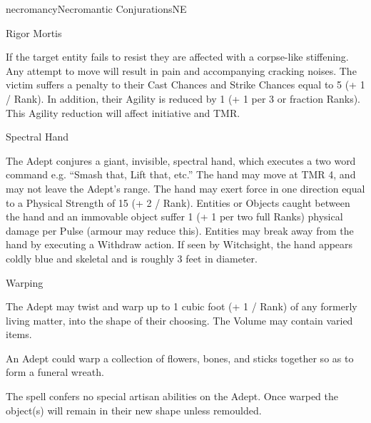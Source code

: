 \begin{College}[1.1]{necromancy}{Necromantic Conjurations}{NE}
\begin{spell}[G-9]{Rigor Mortis}
\begin{effects}
If the target entity fails to resist they are affected with a
corpse-like stiffening. Any attempt to move will result in pain and
accompanying cracking noises.  The victim suffers a penalty to their
Cast Chances and Strike Chances equal to 5 (+ 1 / Rank).  In addition,
their Agility is reduced by 1 (+ 1 per 3 or fraction Ranks).  This
Agility reduction will affect initiative and TMR.
\end{effects}
\end{spell}

\begin{spell}[G-10]{Spectral Hand}
\begin{effects}
The Adept conjures a giant, invisible, spectral hand, which executes a
two word command e.g.  “Smash that, Lift that, etc.”  The hand may
move at TMR 4, and may not leave the Adept’s range.  The hand may
exert force in one direction equal to a Physical Strength of 15 (+ 2 /
Rank). Entities or Objects caught between the hand and an immovable
object suffer 1 (+ 1 per two full Ranks) physical damage per Pulse
(armour may reduce this).  Entities may break away from the hand by
executing a Withdraw action.  If seen by Witchsight, the hand appears
coldly blue and skeletal and is roughly 3 feet in diameter.
\end{effects}
\end{spell}

\begin{spell}[G-11]{Warping}
\begin{effects}
The Adept may twist and warp up to 1 cubic foot (+ 1 / Rank) of any
formerly living matter, into the shape of their choosing.  The Volume
may contain varied items.

\begin{example} 
An Adept could warp a collection of flowers, bones, and sticks
together so as to form a funeral wreath.
\end{example}

The spell confers no special artisan abilities on the Adept.  Once
warped the object(s) will remain in their new shape unless remoulded.
\end{effects}
\end{spell}


\end{College}
